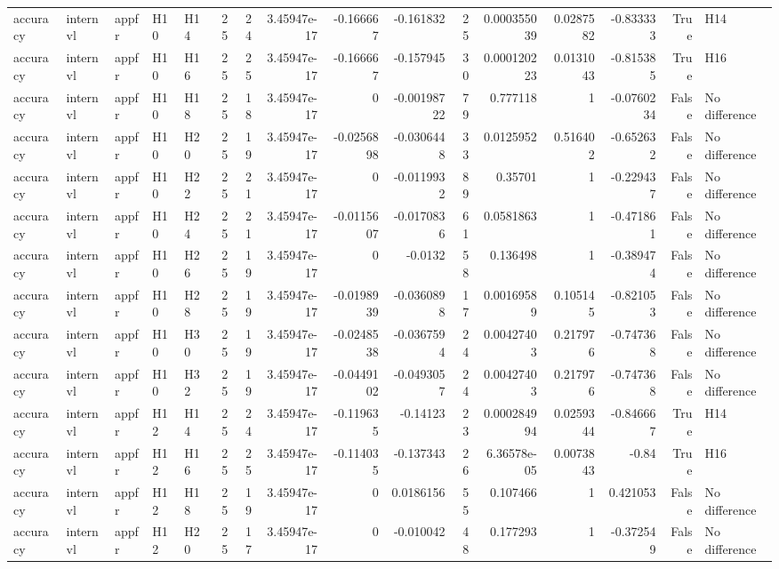 \begin{longtable}{lllllrrrrrrrrrrl}
accuracy & internvl & appfr & H10 & H14 & 25 & 24 & 3.45947e-17 & -0.166667 & -0.161832 & 25 & 0.000355039 & 0.0287582 & -0.833333 & True & H14 \\
accuracy & internvl & appfr & H10 & H16 & 25 & 25 & 3.45947e-17 & -0.166667 & -0.157945 & 30 & 0.000120223 & 0.0131043 & -0.815385 & True & H16 \\
accuracy & internvl & appfr & H10 & H18 & 25 & 18 & 3.45947e-17 & 0 & -0.00198722 & 79 & 0.777118 & 1 & -0.0760234 & False & No difference \\
accuracy & internvl & appfr & H10 & H20 & 25 & 19 & 3.45947e-17 & -0.0256898 & -0.0306448 & 33 & 0.0125952 & 0.516402 & -0.652632 & False & No difference \\
accuracy & internvl & appfr & H10 & H22 & 25 & 21 & 3.45947e-17 & 0 & -0.0119932 & 89 & 0.35701 & 1 & -0.229437 & False & No difference \\
accuracy & internvl & appfr & H10 & H24 & 25 & 21 & 3.45947e-17 & -0.0115607 & -0.0170836 & 61 & 0.0581863 & 1 & -0.471861 & False & No difference \\
accuracy & internvl & appfr & H10 & H26 & 25 & 19 & 3.45947e-17 & 0 & -0.0132 & 58 & 0.136498 & 1 & -0.389474 & False & No difference \\
accuracy & internvl & appfr & H10 & H28 & 25 & 19 & 3.45947e-17 & -0.0198939 & -0.0360898 & 17 & 0.00169589 & 0.105145 & -0.821053 & False & No difference \\
accuracy & internvl & appfr & H10 & H30 & 25 & 19 & 3.45947e-17 & -0.0248538 & -0.0367594 & 24 & 0.00427403 & 0.217976 & -0.747368 & False & No difference \\
accuracy & internvl & appfr & H10 & H32 & 25 & 19 & 3.45947e-17 & -0.0449102 & -0.0493057 & 24 & 0.00427403 & 0.217976 & -0.747368 & False & No difference \\
accuracy & internvl & appfr & H12 & H14 & 25 & 24 & 3.45947e-17 & -0.119635 & -0.14123 & 23 & 0.000284994 & 0.0259344 & -0.846667 & True & H14 \\
accuracy & internvl & appfr & H12 & H16 & 25 & 25 & 3.45947e-17 & -0.114035 & -0.137343 & 26 & 6.36578e-05 & 0.0073843 & -0.84 & True & H16 \\
accuracy & internvl & appfr & H12 & H18 & 25 & 19 & 3.45947e-17 & 0 & 0.0186156 & 55 & 0.107466 & 1 & 0.421053 & False & No difference \\
accuracy & internvl & appfr & H12 & H20 & 25 & 17 & 3.45947e-17 & 0 & -0.010042 & 48 & 0.177293 & 1 & -0.372549 & False & No difference \\

\end{longtable}
